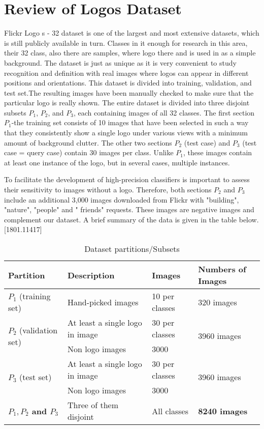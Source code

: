 \section{Review of Logos Dataset}\label{sec:4.3}
\vspace{-0.5cm}
\noindent Flickr Logo s - 32 dataset is one of the largest and most extensive datasets, which is still publicly available in turn. Classes in it enough for research in this area, their 32 class, also there are samples, where logo there and is used in as a simple background. The dataset is just as unique as it is very convenient to study recognition and definition with real images where logos can appear in different positions and orientations. This dataset is divided into training, validation, and test set.The resulting images have been manually checked to make sure that the particular logo is really shown. The entire dataset is divided into three disjoint subsets $P_1$, $P_2$, and $P_3$, each containing images of all 32 classes. The first section $P_1$-the training set consists of 10 images that have been selected in such a way that they consistently show a single logo under various views with a minimum amount of background clutter. The other two sections $P_2$ (test case) and $P_3$ (test case = query case) contain 30 images per class. Unlike $P_1$, these images contain at least one instance of the logo, but in several cases, multiple instances. 

To facilitate the development of high-precision classifiers is important to assess their sensitivity to images without a logo. Therefore, both sections  $P_2$ and  $P_3$ include an additional 3,000 images downloaded from Flickr with "building", "nature", "people" and " friends" requests. These images are negative images and complement our dataset. A brief summary of the data is given in the table below.[1801.11417]


\begin{table}[hbp]
	\centering
	\caption{Dataset partitions/Subsets}
	\label{tab:sample}
	\begin{tabular}{@{}llll@{}}
		\toprule
		Partition & Description & Images & Numbers of Images \\
		\midrule
		$P_1$ (training set) & Hand-picked images & 10 per classes  & 320 images \\
		\multirow{2}{*}{$P_2$ (validation  set)} & At least a single logo in image & 30 per classes & \multirow{2}{*}{3960 images} \\
												 & Non logo images & 3000  &          \\
		\multirow{2}{*}{$P_3$ (test  set)} & At least a single logo in image & 30 per classes & \multirow{2}{*}{3960 images} \\
		& Non logo images & 3000  &          \\
		\textbf{$P_1,P_2$ and $P_3$} & Three of them disjoint & All classes & \textbf{8240 images} \\
		\bottomrule
	\end{tabular}
\end{table}


